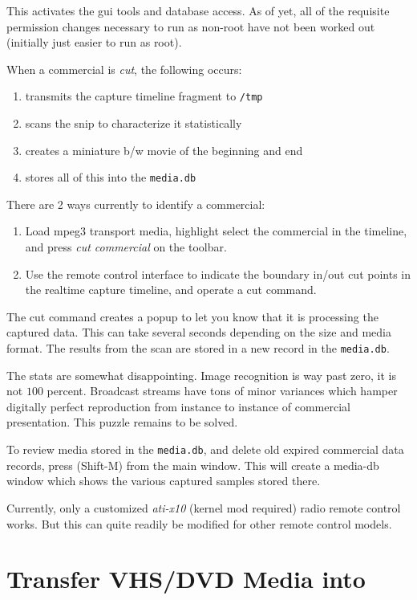 This activates the gui tools and database access.  As of yet, all of the requisite permission changes
necessary to run as non-root have not been worked out (initially just easier to run as root).

When a commercial is \textit{cut}, the following occurs:

\begin{enumerate}
    \item transmits the capture timeline fragment to \texttt{/tmp}
    \item scans the snip to characterize it statistically
    \item creates a miniature b/w movie of the beginning and end
    \item stores all of this into the \texttt{media.db}
\end{enumerate}

There are 2 ways currently to identify a commercial:

\begin{enumerate}
    \item Load mpeg3 transport media, highlight select the commercial in the  timeline, and press \textit{cut commercial} on the toolbar.
    \item Use the remote control interface to indicate the boundary in/out cut points in the realtime capture timeline, and operate a cut command.    
\end{enumerate}

The cut command creates a popup to let you know that it is processing the captured data.  This can take several seconds depending on the size and media format.  The results from the scan are stored in a new record in the \texttt{media.db}.

The stats are somewhat disappointing.  Image recognition is way past zero, it is not $100$ percent. Broadcast streams have tons of minor variances which hamper digitally perfect reproduction from instance to instance of commercial presentation.  This puzzle remains to be solved.

To review media stored in the \texttt{media.db}, and delete old expired commercial data records, press (Shift-M) from the main window.  This will create a media-db window which shows the various captured samples stored there.

Currently, only a customized \textit{ati-x10} (kernel mod required) radio remote control works.  But this can quite readily be modified for other remote control models.

\section{Transfer VHS/DVD Media into \CGG{}}%
\label{sec:transfer_vhs_dvd_into_cinelerra}

